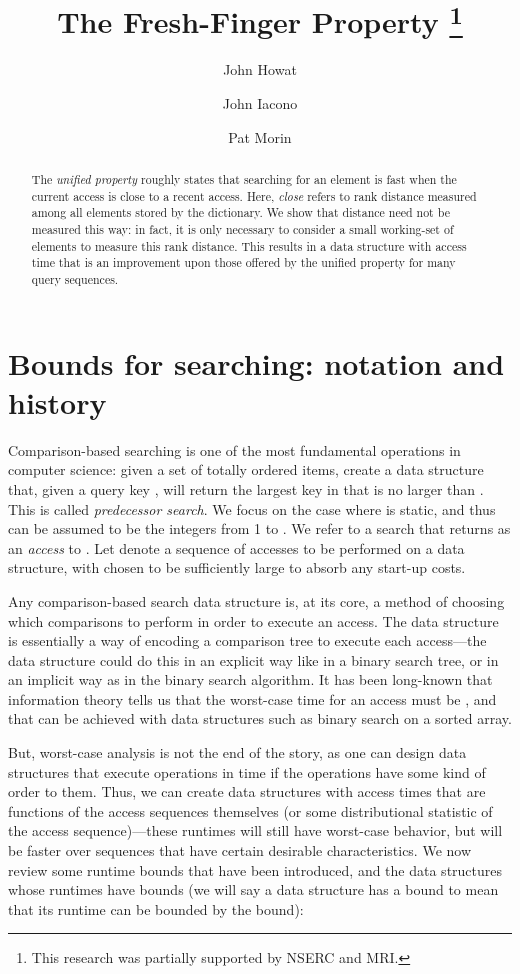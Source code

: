 \documentclass{llncs}
\title{The Fresh-Finger Property \thanks{This research was partially supported by NSERC and MRI.}}
\author{John Howat\inst{1} \and John Iacono\inst{2} \and Pat Morin\inst{3}}
\institute{School of Computing\\Queen's University\\\email{howat@cs.queensu.ca}
\and Department of Computer Science and Engineering\\Polytechnic Institute of New York University\\\email{jiacono@poly.edu} \and
School of Computer Science\\Carleton University\\\email{morin@scs.carleton.ca}}
\begin{document}
\maketitle
\thispagestyle{plain}
\begin{abstract}
The \emph{unified property} roughly states that searching for an element is fast when the current access is close to a recent access. Here, \emph{close} refers to rank distance measured among all elements stored by the dictionary. We show that distance need not be measured this way: in fact, it is only necessary to consider a small working-set of elements to measure this rank distance. This results in a data structure with access time that is an improvement upon those offered by the unified property for many query sequences.
\end{abstract}



\section{Bounds for searching: notation and history}

Comparison-based searching is one of the most fundamental operations in computer science: given a set  of  totally ordered items, create a data structure that, given a query key , will return the largest key in  that is no larger than . This is called \emph{predecessor search}. We focus on the case where  is static, and thus can be assumed to be the integers from 1 to . We refer to a search that returns  as an \emph{access} to . Let  denote a sequence of accesses to be performed on a data structure, with  chosen to be sufficiently large to absorb any start-up costs.

Any comparison-based search data structure is, at its core, a method of choosing which comparisons to perform in order to execute an access. The data structure is essentially a way of encoding a comparison tree to execute each access---the data structure could do this in an explicit way like in a binary search tree, or in an implicit way as in the binary search algorithm. It has been long-known that information theory tells us that the worst-case time for an access must be , and that  can be achieved with data structures such as binary search on a sorted array.

But, worst-case analysis is not the end of the story, as one can design data structures that execute operations in  time if the operations have some kind of order to them. Thus, we can create data structures with access times that are functions of the access sequences themselves (or some distributional statistic of the access sequence)---these runtimes will still have  worst-case behavior, but will be faster over sequences that have certain desirable characteristics. We now review some runtime bounds that have been introduced, and the data structures whose runtimes have bounds (we will say a data structure has a bound to mean that its runtime can be bounded by the bound):
\end{document}
